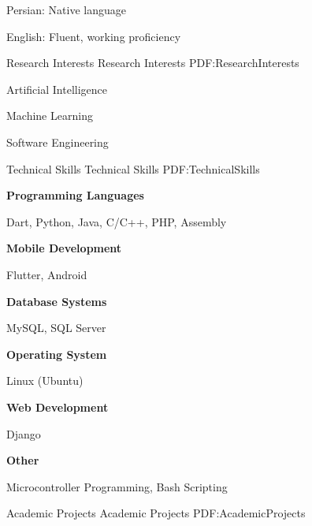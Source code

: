 \documentclass[letterpaper,MMMyyyy,nonstopmode]{simpleresumecv}
\begin{document}
\begin{Body}
\BulletItem
Persian: Native language

\Gap
\BulletItem
English: Fluent, working proficiency


\Section
{Research Interests}
{Research Interests}
{PDF:ResearchInterests}

\BulletItem
Artificial Intelligence

\BulletItem
Machine Learning

\BulletItem
Software Engineering


\Section
{Technical Skills}
{Technical Skills}
{PDF:TechnicalSkills}

\begin{multicols}{2}
\begin{itemize}[leftmargin=*]
\BulletItem
\textbf{Programming Languages}
\begin{Detail}
\Item
Dart, Python, Java, C/C++, PHP, Assembly
\end{Detail}

\Gap
\BulletItem
\textbf{Mobile Development}
\begin{Detail}
\Item
Flutter, Android
\end{Detail}

\Gap
\BulletItem
\textbf{Database Systems}
\begin{Detail}
\Item
MySQL, SQL Server
\end{Detail}

\columnbreak

\BulletItem
\textbf{Operating System}
\begin{Detail}
\Item
Linux (Ubuntu)
\end{Detail}

\Gap
\BulletItem
\textbf{Web Development}
\begin{Detail}
\Item
Django
\end{Detail}

\Gap
\BulletItem
\textbf{Other}
\begin{Detail}
\Item
Microcontroller Programming, Bash Scripting
\end{Detail}

\end{itemize}
\end{multicols}


\Section
{Academic Projects}
{Academic Projects}
{PDF:AcademicProjects}


\end{Body}
\end{document}

